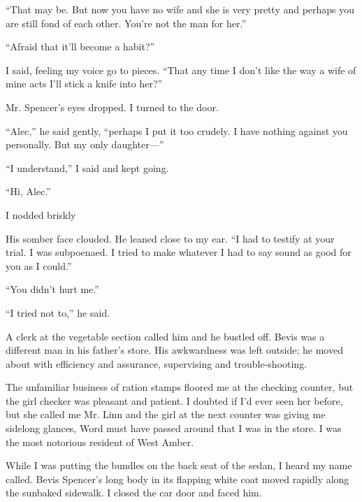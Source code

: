 \documentclass{novel}
\begin{document}
“That may be. But now you have no wife and she is very pretty and perhaps you are still fond of each other. You’re not the man for her.”

“Afraid that it’ll become a habit?”

I said, feeling my voice go to pieces. “That any time I don’t like the way a wife of mine acts I’ll stick a knife into her?”

Mr. Spencer’s eyes dropped. I turned to the door.

“Alec,” he said gently, “perhaps I put it too crudely. I have nothing against you personally. But my only daughter—”

“I understand,” I said and kept going.

\vspace{1\nbs}
\clearpage
\thispagestyle{empty}
\begin{ChapterStart}
\vspace{3\nbs}
\end{ChapterStart}

“Hi, Alec.”

I nodded briskly

His somber face clouded. He leaned close to my ear. “I had to testify at your trial. I was subpoenaed. I tried to make whatever I had to say sound as good for you as I could.”

“You didn’t hurt me.”

“I tried not to,” he said.

A clerk at the vegetable section called him and he bustled off. Bevis was a different man in his father’s store. His awkwardness was left outside; he moved about with efficiency and assurance, supervising and trouble-shooting.

The unfamiliar business of ration stamps floored me at the checking counter, but the girl checker was pleasant and patient. I doubted if I’d ever seen her before, but she called me Mr. Linn and the girl at the next counter was giving me sidelong glances, Word must have passed around that I was in the store. I was the most notorious resident of West Amber.

While I was putting the bundles on the back seat of the sedan, I heard my name called. Bevis Spencer’s long body in its flapping white coat moved rapidly along the sunbaked sidewalk. I closed the car door and faced him.
\end{document}
